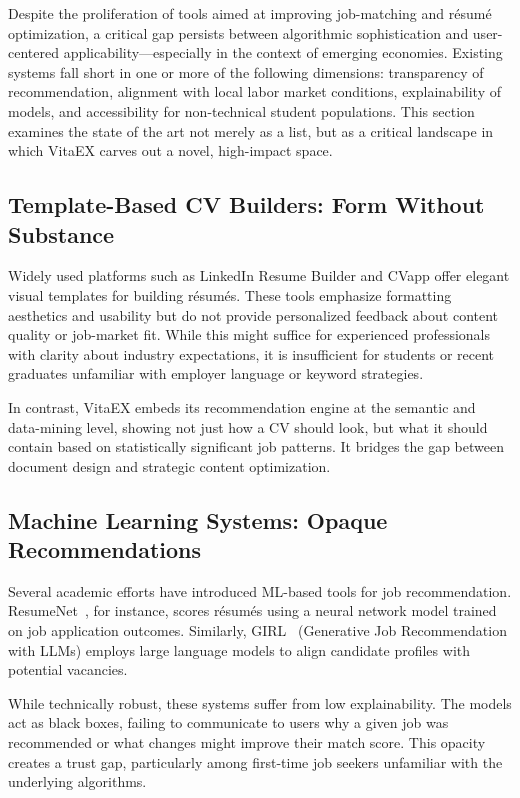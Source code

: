 \documentclass[runningheads]{llncs}
\begin{document}
	Despite the proliferation of tools aimed at improving job-matching and résumé optimization, a critical gap persists between algorithmic sophistication and user-centered applicability—especially in the context of emerging economies. Existing systems fall short in one or more of the following dimensions: transparency of recommendation, alignment with local labor market conditions, explainability of models, and accessibility for non-technical student populations. This section examines the state of the art not merely as a list, but as a critical landscape in which VitaEX carves out a novel, high-impact space.
	
	\subsection{Template-Based CV Builders: Form Without Substance}
	
	Widely used platforms such as LinkedIn Resume Builder and CVapp offer elegant visual templates for building résumés. These tools emphasize formatting aesthetics and usability but do not provide personalized feedback about content quality or job-market fit. While this might suffice for experienced professionals with clarity about industry expectations, it is insufficient for students or recent graduates unfamiliar with employer language or keyword strategies.
	
	In contrast, VitaEX embeds its recommendation engine at the semantic and data-mining level, showing not just how a CV should look, but what it should contain based on statistically significant job patterns. It bridges the gap between document design and strategic content optimization.
	
	\subsection{Machine Learning Systems: Opaque Recommendations}
	
	Several academic efforts have introduced ML-based tools for job recommendation. ResumeNet~\cite{estadoarte3}, for instance, scores résumés using a neural network model trained on job application outcomes. Similarly, GIRL~\cite{estadoarte2} (Generative Job Recommendation with LLMs) employs large language models to align candidate profiles with potential vacancies.
	
	While technically robust, these systems suffer from low explainability. The models act as black boxes, failing to communicate to users why a given job was recommended or what changes might improve their match score. This opacity creates a trust gap, particularly among first-time job seekers unfamiliar with the underlying algorithms.
	
\end{document}
